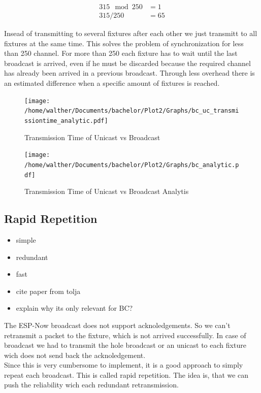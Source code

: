 \documentclass[]{ccs-thesis}
\begin{document}
\begin{align*}
	315 \mod 250 &= 1 \\
	315 / 250 &= 65
\end{align*}

Insead of transmitting to several fixtures after each other we just transmitt to all fixtures at the same time.
This solves the problem of synchronization for less than 250 channel.
For more than 250 each fixture has to wait until the last broadcast is arrived, 
even if he must be discarded because the required channel has already been arrived in a previous broadcast.
Through less overhead there is an estimated difference when a specific amount of fixtures is reached.

\begin{figure}
	\centering
	\texttt{[image: /home/walther/Documents/bachelor/Plot2/Graphs/bc\_uc\_transmissiontime\_analytic.pdf]}
	\caption{Transmission Time of Unicast vs Broadcast}
	\label{fig:bc_uc_transmissiontime_analytic}
\end{figure}

\begin{figure}
	\centering
	\texttt{[image: /home/walther/Documents/bachelor/Plot2/Graphs/bc\_analytic.pdf]}
	\caption{Transmission Time of Unicast vs Broadcast Analytis}
	\label{fig:bc_analytic}
\end{figure}

\subsection{Rapid Repetition}
\begin{itemize}
\item simple
\item redundant
\item fast
\item cite paper from tolja
\item explain why its only relevant for BC?
\end{itemize}

The ESP-Now broadcast does not support acknoledgements.
So we can't retransmit a packet to the fixture, which is not arrived successfully.
In case of broadcast we had to transmit the hole broadcast or an unicast to each fixture wich does not send back the acknoledgement.\\

Since this is very cumbersome to implement, it is a good approach to simply repeat each broadcast. 
This is called rapid repetition. 
The idea is, that we can push the reliability wich each redundant retransmission.
\end{document}
